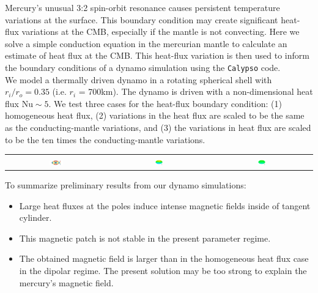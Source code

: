 \documentclass[landscape,a0b,final]{a0poster}
\begin{document}
\begin{multicols}{3}
Mercury's unusual 3:2 spin-orbit resonance causes persistent temperature variations at the surface.  This boundary condition may create significant heat-flux variations at the CMB, especially if the mantle is not convecting.  Here we solve a simple conduction equation in the mercurian mantle to calculate an estimate of heat flux at the CMB.  This heat-flux variation is then used to inform the boundary conditions of a dynamo simulation using the \texttt{Calypso} code.
\\
We model a thermally driven dynamo in a rotating spherical shell with $r_{i}/r_{o} = 0.35$ (i.e.  $r_i$ = 700km).  The dynamo is driven with a non-dimensional heat flux $\mathrm{Nu} \sim 5$.  We test three cases for the heat-flux boundary condition: (1) homogeneous heat flux, (2) variations in the heat flux are scaled to be the same as the conducting-mantle variations, and (3) the variations in heat flux are scaled to be the ten times the conducting-mantle variations.
\begin{center}
\begin{tabular}{ccc}
 \includegraphics[width=0.14\textwidth]{CMB_flux.pdf} &
 \includegraphics[width=0.08\textwidth]{br_cmb_x0.png} &
 \includegraphics[width=0.08\textwidth]{br_cmb_x10.png}
\end{tabular}
\label{dynamo}
\end{center}

To summarize preliminary results from our dynamo simulations:
\begin{itemize}
\item Large heat fluxes at the poles induce intense magnetic fields inside of tangent cylinder.
\item This magnetic patch is not stable in the present parameter regime.
\item The obtained magnetic field is larger than in the homogeneous heat flux case in the dipolar regime. The present solution may be too strong to explain the mercury's magnetic field.
\end{itemize}


\end{multicols}
\end{document}
